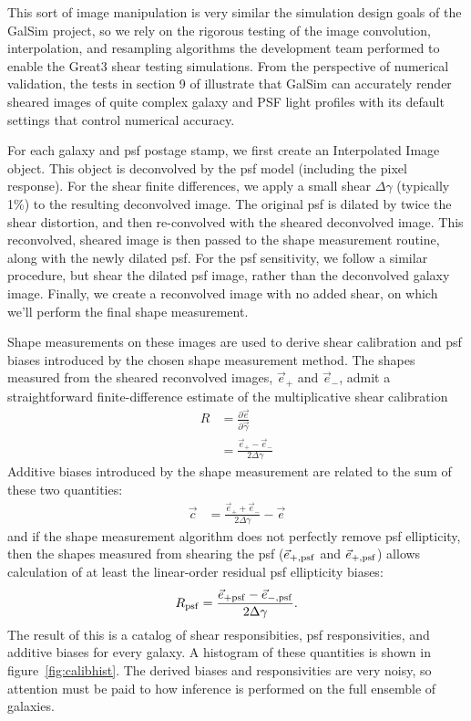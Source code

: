 \documentclass[iop]{emulateapj}
\begin{document}
This sort of image manipulation is very similar the simulation design goals of the GalSim project,
so we rely on the rigorous testing of the image convolution, interpolation, and resampling
algorithms the development team performed to enable the Great3 shear testing simulations.  From the
perspective of numerical validation, the tests in section 9 of \cite{2015A&C....10..121R} illustrate
that GalSim can accurately render sheared images of quite complex galaxy and PSF light profiles with
its default settings that control numerical accuracy.

For each galaxy and psf postage stamp, we first create an Interpolated Image object. This object is deconvolved by the psf model (including the pixel response). For the shear finite differences, we apply a small shear $\Delta\gamma$ (typically 1\%) to the resulting deconvolved image. The original psf is dilated by twice the shear distortion, and then re-convolved with the sheared deconvolved image. This reconvolved, sheared image is then passed to the shape measurement routine, along with the newly dilated psf. For the psf sensitivity, we follow a similar procedure, but shear the dilated psf image, rather than the deconvolved galaxy image. Finally, we create a reconvolved image with no added shear, on which we'll perform the final shape measurement. 

Shape measurements on these images are used to derive shear calibration and psf biases {introduced by the chosen shape measurement method}. The shapes measured from the  sheared reconvolved images, $\vec{e}_{+}$ and $\vec{e}_{-}$, admit a straightforward finite-difference estimate of the multiplicative shear calibration
\begin{align}
R &= \frac{\partial \vec{e}}{\partial \vec{\gamma}}  \\
 &=\frac{\vec{e}_{+} - \vec{e}_{-}}{2\Delta\gamma}
\end{align}
Additive biases introduced by the shape measurement are related to the sum of these two quantities:
\begin{align}
\vec{c} &= \frac{\vec{e}_{+} + \vec{e}_{-}}{2 \Delta\gamma} - \vec{e}
\end{align}
and if the shape measurement algorithm does not perfectly remove psf ellipticity, then the shapes measured from shearing the psf ($\vec{e}_{+,\rm psf}$ and $\vec{e}_{+,\rm psf}$) allows calculation of at least the linear-order residual psf ellipticity biases:
\begin{align}
R_{\rm psf} = \frac{\vec{e}_{+\rm psf} - \vec{e}_{-,\rm psf}}{2\Delta\gamma}.
\end{align}
The result of this is a catalog of shear responsibities, psf responsivities, and additive biases for every galaxy. A histogram of these quantities is shown in figure~\ref{fig:calibhist}. The derived biases and responsivities are very noisy, so attention must be paid to how inference is performed on the full ensemble of galaxies.
\end{document}
